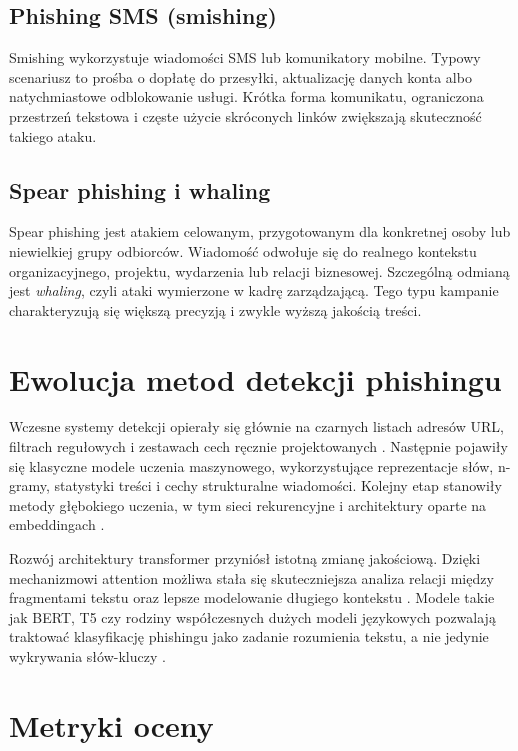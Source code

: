 \documentclass[12pt,a4paper,openany]{report}
\begin{document}
\subsection{Phishing SMS (smishing)}

Smishing wykorzystuje wiadomości SMS lub komunikatory mobilne. Typowy scenariusz to prośba o dopłatę do przesyłki, aktualizację danych konta albo natychmiastowe odblokowanie usługi. Krótka forma komunikatu, ograniczona przestrzeń tekstowa i częste użycie skróconych linków zwiększają skuteczność takiego ataku.

\subsection{Spear phishing i whaling}

Spear phishing jest atakiem celowanym, przygotowanym dla konkretnej osoby lub niewielkiej grupy odbiorców. Wiadomość odwołuje się do realnego kontekstu organizacyjnego, projektu, wydarzenia lub relacji biznesowej. Szczególną odmianą jest \textit{whaling}, czyli ataki wymierzone w kadrę zarządzającą. Tego typu kampanie charakteryzują się większą precyzją i zwykle wyższą jakością treści.

\section{Ewolucja metod detekcji phishingu}

Wczesne systemy detekcji opierały się głównie na czarnych listach adresów URL, filtrach regułowych i zestawach cech ręcznie projektowanych \cite{bergholz2010filtering,fette2007learning}. Następnie pojawiły się klasyczne modele uczenia maszynowego, wykorzystujące reprezentacje słów, n-gramy, statystyki treści i cechy strukturalne wiadomości. Kolejny etap stanowiły metody głębokiego uczenia, w tym sieci rekurencyjne i architektury oparte na embeddingach \cite{hochreiter1997lstm,chollet2017deep}.

Rozwój architektury transformer przyniósł istotną zmianę jakościową. Dzięki mechanizmowi attention możliwa stała się skuteczniejsza analiza relacji między fragmentami tekstu oraz lepsze modelowanie długiego kontekstu \cite{vaswani2017attention}. Modele takie jak BERT, T5 czy rodziny współczesnych dużych modeli językowych pozwalają traktować klasyfikację phishingu jako zadanie rozumienia tekstu, a nie jedynie wykrywania słów-kluczy \cite{devlin2018bert,raffel2019exploring,rahmadani2023robust,wagner2024llms}.

\section{Metryki oceny}
\end{document}
